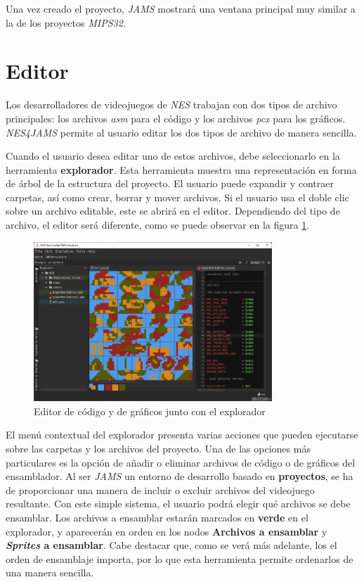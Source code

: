 Una vez creado el proyecto, \textit{JAMS} mostrará una ventana
principal muy similar a la de los proyectos \textit{MIPS32}.


\section{Editor}\label{sec:editor}

Los desarrolladores de videojuegos de \textit{NES} trabajan con
dos tipos de archivo principales: los archivos \textit{asm}
para el código y los archivos \textit{pcx} para los gráficos.
\textit{NES4JAMS} permite al usuario editar los dos tipos de archivo
de manera sencilla.

Cuando el usuario desea editar uno de estos archivos,
debe seleccionarlo en la herramienta \textbf{explorador}.
Esta herramienta muestra una representación en forma de árbol
de la estructura del proyecto.
El usuario puede expandir y contraer carpetas, así como crear,
borrar y mover archivos.
Si el usuario usa el doble clic sobre un archivo editable, este se abrirá
en el editor.
Dependiendo del tipo de archivo, el editor será diferente,
como se puede observar en la figura \ref{fig:nes-editor}.

\begin{figure}[h]
    \centering
    \includegraphics[width=0.8\textwidth]{images/nes/nes-editor}
    \caption{Editor de código y de gráficos junto con el explorador}
    \label{fig:nes-editor}
\end{figure}

El menú contextual del explorador presenta varias acciones que
pueden ejecutarse sobre las carpetas y los archivos
del proyecto.
Una de las opciones más particulares es la opción de añadir o eliminar
archivos de código o de gráficos del ensamblador.
Al ser \textit{JAMS} un entorno de desarrollo basado en \textbf{proyectos},
se ha de proporcionar una manera de incluir o excluir archivos del
videojuego resultante.
Con este simple sistema, el usuario podrá elegir qué archivos se debe ensamblar.
Los archivos a ensamblar estarán marcados en \textbf{verde} en el explorador,
y aparecerán en orden en los nodos \textbf{Archivos a ensamblar} y
\textbf{\textit{Sprites} a ensamblar}.
Cabe destacar que, como se verá más adelante, los el orden de ensamblaje
importa, por lo que esta herramienta permite ordenarlos de una manera sencilla.

